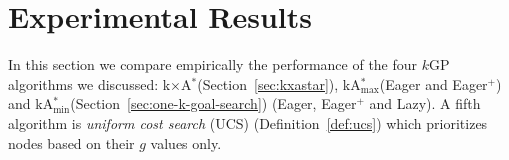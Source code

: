 \documentclass[twoside,11pt]{article}
\newcommand{\kgs}{$k$GP\xspace}
\newcommand{\astar}{A$^*$\xspace}
\newcommand{\kastar}{kA$^*$\xspace}
\newcommand{\kastarvar}[1]{\textup{kA}$^*_{#1}$\xspace}
\newcommand{\kastarmin}{\kastarvar{\min}}
\newcommand{\kastarmax}{\kastarvar{\max}}
\newcommand{\kxastar}{k$\times$A$^*$\xspace}
\newcommand{\minf}{$F_{min}(n)$\xspace}
\newcommand{\open}{\textsc{Open}\xspace}
\newcommand{\roni}[1]{\textbf{[RS:#1]}}
\begin{document}


\section{Experimental Results}
\label{sec:experimentalResults}

In this section we compare empirically the performance of the four \kgs algorithms we discussed: \kxastar (Section~\ref{sec:kxastar}), \kastarmax (Eager and Eager$^+$) and \kastarmin (Section~\ref{sec:one-k-goal-search}) (Eager, Eager$^+$ and Lazy).
A fifth algorithm is \emph{uniform cost search} (UCS) (Definition~\ref{def:ucs}) which prioritizes nodes based on their $g$ values only.
\end{document}
